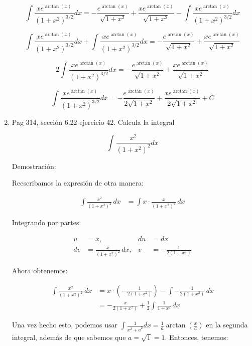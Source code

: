 \documentclass{report}
\begin{document}
\begin{enumerate}
        \[ \int{\frac{xe^{\arctan(x)}}{(1+x^2)^{3/2}}dx} = -\frac{e^{\arctan(x)}}{\sqrt{1+x^2}} + \frac{xe^{\arctan(x)}}{\sqrt{1+x^2}} - \int{\frac{xe^{\arctan(x)}}{(1+x^2)^{3/2}}dx} \]
        
        \[ \int{\frac{xe^{\arctan(x)}}{(1+x^2)^{3/2}}dx} + \int{\frac{xe^{\arctan(x)}}{(1+x^2)^{3/2}}dx} = -\frac{e^{\arctan(x)}}{\sqrt{1+x^2}} + \frac{xe^{\arctan(x)}}{\sqrt{1+x^2}} \]
        
        \[ 2\int{\frac{xe^{\arctan(x)}}{(1+x^2)^{3/2}}dx} = -\frac{e^{\arctan(x)}}{\sqrt{1+x^2}} + \frac{xe^{\arctan(x)}}{\sqrt{1+x^2}} \]
        
        \[ \int{\frac{xe^{\arctan(x)}}{(1+x^2)^{3/2}}dx} = -\frac{e^{\arctan(x)}}{2\sqrt{1+x^2}} + \frac{xe^{\arctan(x)}}{2\sqrt{1+x^2}} + C \]
        
        \item Pag 314, sección 6.22 ejercicio 42. Calcula la integral
        
        $$\int \frac{x^{2}}{\left(1+x^{2}\right)^{2}} d x$$
        
        Demostración:
        
        Reescribamos la expresión de otra manera:
        
        \begin{align*}
        \int{\frac{x^2}{(1+x^2)^2}\,dx} &= \int{x \cdot \frac{x}{(1+x^2)^2}\,dx}
        \end{align*}
        
        Integrando por partes:
        
        \begin{align*}
        u &= x, &du &= dx \\
        dv &= \frac{x}{(1+x^2)^2}\,dx, &v &= -\frac{1}{2(1+x^2)}
        \end{align*}
        
        Ahora obtenemos:
        
        \begin{align*}
        \int{\frac{x^2}{(1+x^2)^2}\,dx} &= x \cdot \left(-\frac{1}{2(1+x^2)}\right) - \int{-\frac{1}{2(1+x^2)}\,dx} \\
        &= -\frac{x}{2(1+x^2)} + \frac{1}{2}\int{\frac{1}{1+x^2}\,dx}
        \end{align*}
        
        Una vez hecho esto, podemos usar $\int \frac{1}{{x^2+a}^2}dx = \frac{1}{a}\arctan{\left(\frac{x}{a}\right)}$ en la segunda integral, además de que sabemos que $a = \sqrt{1} = 1$. Entonces, tenemos:
        

\end{enumerate}
\end{document}
